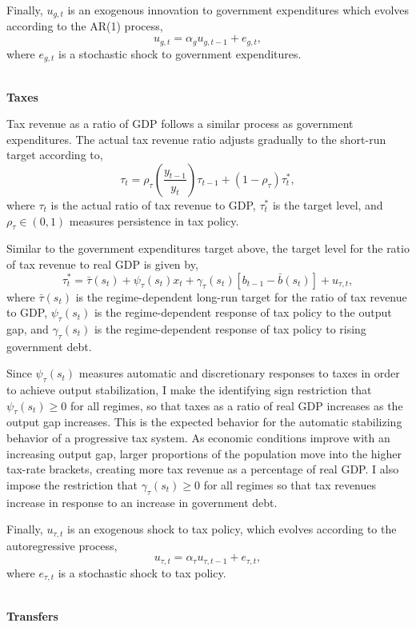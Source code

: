 \documentclass[11pt]{article}
\newcommand{\beq}{\begin{equation}}
\newcommand{\eeq}{\end{equation}}
\begin{document}
Finally, $u_{g,t}$ is an exogenous innovation to government expenditures which evolves according to the AR(1) process,
\beq \label{eq:govarshock} u_{g,t} = \alpha_g u_{g,t-1} + e_{g,t} ,\eeq
where $e_{g,t}$ is a stochastic shock to government expenditures.  

\ \\ \noindent \textbf{Taxes}

\noindent Tax revenue as a ratio of GDP follows a similar process as government expenditures.  The actual tax revenue ratio adjusts gradually to the short-run target according to,
\beq \label{eq:taxrat} \tau_t = \rho_\tau \left( \frac{y_{t-1}}{y_t} \right) \tau_{t-1} + \left(1-\rho_\tau \right) \tau_t^*, \eeq
where $\tau_t$ is the actual ratio of tax revenue to GDP, $\tau_t^*$ is the target level, and $\rho_\tau \in (0,1)$ measures persistence in tax policy.

Similar to the government expenditures target above, the target level for the ratio of tax revenue to real GDP is given by,
\beq \label{eq:taxtarget} \tau_t^* = \bar{\tau}(s_t) + \psi_\tau(s_t) x_t + \gamma_\tau(s_t) \left[ b_{t-1} - \bar{b}(s_t) \right] + u_{\tau,t}, \eeq
where $\bar{\tau}(s_t)$ is the regime-dependent long-run target for the ratio of tax revenue to GDP, $\psi_\tau(s_t)$ is the regime-dependent response of tax policy to the output gap, and $\gamma_\tau(s_t)$ is the regime-dependent response of tax policy to rising government debt. 

Since $\psi_{\tau}(s_t)$ measures automatic and discretionary responses to taxes in order to achieve output stabilization, I make the identifying sign restriction that $\psi_{\tau}(s_t) \geq 0$ for all regimes, so that taxes as a ratio of real GDP increases as the output gap increases.  This is the expected behavior for the automatic stabilizing behavior of a progressive tax system.  As economic conditions improve with an increasing output gap, larger proportions of the population move into the higher tax-rate brackets, creating more tax revenue as a percentage of real GDP.  I also impose the restriction that $\gamma_\tau(s_t) \geq 0$ for all regimes so that tax revenues increase in response to an increase in government debt.

Finally, $u_{\tau,t}$ is an exogenous shock to tax policy, which evolves according to the autoregressive process,
\beq \label{eq:taxarshock} u_{\tau,t} = \alpha_\tau u_{\tau,t-1} + e_{\tau,t}, \eeq
where $e_{\tau,t}$ is a stochastic shock to tax policy.

\ \\ \noindent \textbf{Transfers}
\end{document}
